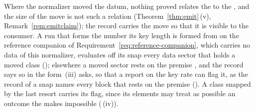 
Where the normalizer moved the datum, nothing proved relates the
 to the , and the size of the move is
not such a relation (Theorem~\ref{thm:emit}\,(v),
Remark~\ref{rem:emitclaim}); the record carries the move so that it is visible
to the consumer. A run that forms the number its key length is formed
from on the reference companion of Requirement~\ref{req:reference-companion},
which carries no data of this normalizer, evaluates off its snap every data
sector that holds a moved class
(); elsewhere a moved sector rests on
the premise , and the record says so
in the form \,(iii) asks, so that a
report on the key rate can flag it, as the record of a snap names every block
that rests on the premise (). A class snapped
by the last resort carries its flag, since its elements may treat as possible
an outcome the  makes impossible
(\,(iv)).

